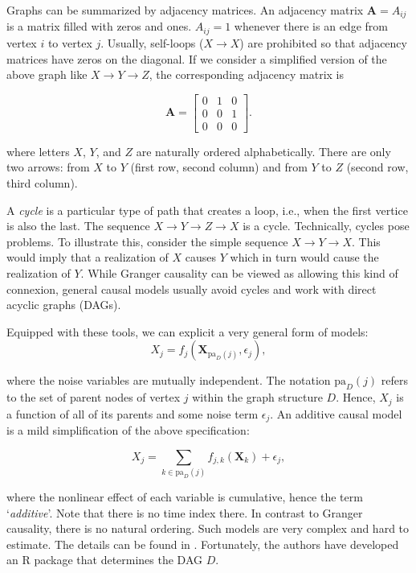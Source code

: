 \documentclass[]{krantz}
\theoremstyle{definition}
\theoremstyle{definition}
\theoremstyle{definition}
\theoremstyle{remark}
\begin{document}
Graphs can be summarized by adjacency matrices. An adjacency matrix
\(\textbf{A}=A_{ij}\) is a matrix filled with zeros and ones.
\(A_{ij}=1\) whenever there is an edge from vertex \(i\) to vertex
\(j\). Usually, self-loops (\(X \rightarrow X\)) are prohibited so that
adjacency matrices have zeros on the diagonal. If we consider a
simplified version of the above graph like
\(X \rightarrow Y \rightarrow Z\), the corresponding adjacency matrix is

\[\textbf{A}=\begin{bmatrix} 
0 & 1 & 0 \\
0 & 0 & 1 \\
0& 0&0
\end{bmatrix}.\]

where letters \(X\), \(Y\), and \(Z\) are naturally ordered
alphabetically. There are only two arrows: from \(X\) to \(Y\) (first
row, second column) and from \(Y\) to \(Z\) (second row, third column).

A \emph{cycle} is a particular type of path that creates a loop, i.e.,
when the first vertice is also the last. The sequence
\(X \rightarrow Y \rightarrow Z \rightarrow X\) is a cycle. Technically,
cycles pose problems. To illustrate this, consider the simple sequence
\(X \rightarrow Y \rightarrow X\). This would imply that a realization
of \(X\) causes \(Y\) which in turn would cause the realization of
\(Y\). While Granger causality can be viewed as allowing this kind of
connexion, general causal models usually avoid cycles and work with
direct acyclic graphs (DAGs).

Equipped with these tools, we can explicit a very general form of
models: \begin{equation}
\label{eq:CAM0} 
X_j=f_j\left(\textbf{X}_{\text{pa}_D(j)},\epsilon_j  \right),
\end{equation}

where the noise variables are mutually independent. The notation
\(\text{pa}_D(j)\) refers to the set of parent nodes of vertex \(j\)
within the graph structure \(D\). Hence, \(X_j\) is a function of all of
its parents and some noise term \(\epsilon_j\). An additive causal model
is a mild simplification of the above specification:

\begin{equation}
\label{eq:CAM} 
X_j=\sum_{k\in \text{pa}_D(j)}f_{j,k}\left(\textbf{X}_{k}  \right)+\epsilon_j,
\end{equation}

where the nonlinear effect of each variable is cumulative, hence the
term `\emph{additive}'. Note that there is no time index there. In
contrast to Granger causality, there is no natural ordering. Such models
are very complex and hard to estimate. The details can be found in
\citet{buhlmann2014cam}. Fortunately, the authors have developed an R
package that determines the DAG \(D\).
\end{document}
